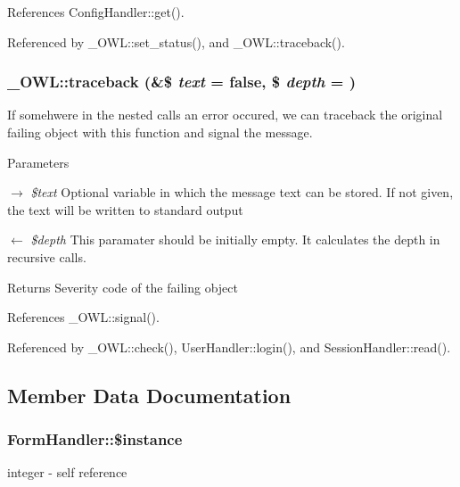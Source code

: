 References ConfigHandler::get().



Referenced by \_\-OWL::set\_\-status(), and \_\-OWL::traceback().

\subsubsection[{traceback}]{\setlength{\rightskip}{0pt plus 5cm}\_\-OWL::traceback (\&\$ {\em text} = {\ttfamily false}, \/  \$ {\em depth} = {})}\label{class__OWL_aa29547995d6741b7d2b90c1d4ea99a13}
If somehwere in the nested calls an error occured, we can traceback the original failing object with this function and signal the message.


\begin{DoxyParams}{Parameters}
\item[\mbox{$\rightarrow$} {\em \$text}]Optional variable in which the message text can be stored. If not given, the text will be written to standard output \item[\mbox{$\leftarrow$} {\em \$depth}]This paramater should be initially empty. It calculates the depth in recursive calls. \end{DoxyParams}
\begin{DoxyReturn}{Returns}
Severity code of the failing object 
\end{DoxyReturn}


References \_\-OWL::signal().



Referenced by \_\-OWL::check(), UserHandler::login(), and SessionHandler::read().



\subsection{Member Data Documentation}
\subsubsection[{\$instance}]{\setlength{\rightskip}{0pt plus 5cm}FormHandler::\$instance}\label{classFormHandler_a54efe3849e4065053f0eb0313356d072}
integer -\/ self reference 

